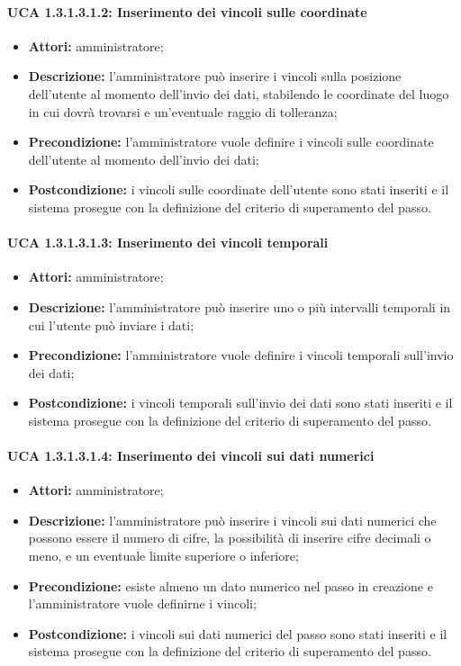 \paragraph{UCA 1.3.1.3.1.2: Inserimento dei vincoli sulle coordinate}
\begin{itemize}
\item \textbf{Attori:} 
amministratore;
\item \textbf{Descrizione:} 
l'amministratore può inserire i vincoli sulla posizione dell'utente al momento dell'invio dei dati, stabilendo le coordinate del luogo in cui dovrà trovarsi e un'eventuale raggio di tolleranza;
\item \textbf{Precondizione:} 
l'amministratore vuole definire i vincoli sulle coordinate dell'utente al momento dell'invio dei dati;
\item \textbf{Postcondizione:}
i vincoli sulle coordinate dell'utente sono stati inseriti e il sistema prosegue con la definizione del criterio di superamento del passo.
\end{itemize}

\paragraph{UCA 1.3.1.3.1.3: Inserimento dei vincoli temporali}
\begin{itemize}
\item \textbf{Attori:} 
amministratore;
\item \textbf{Descrizione:} 
l'amministratore può inserire uno o più intervalli temporali in cui l'utente può inviare i dati;
\item \textbf{Precondizione:} 
l'amministratore vuole definire i vincoli temporali sull'invio dei dati;
\item \textbf{Postcondizione:}
i vincoli temporali sull'invio dei dati sono stati inseriti e il sistema prosegue con la definizione del criterio di superamento del passo.
\end{itemize}

\paragraph{UCA 1.3.1.3.1.4: Inserimento dei vincoli sui dati numerici}
\begin{itemize}
\item \textbf{Attori:} 
amministratore;
\item \textbf{Descrizione:} 
l'amministratore può inserire i vincoli sui dati numerici che possono essere il numero di cifre, la possibilità di inserire cifre decimali o meno, e un eventuale limite superiore o inferiore;
\item \textbf{Precondizione:} 
esiste almeno un dato numerico nel passo in creazione e l'amministratore vuole definirne i vincoli;
\item \textbf{Postcondizione:}
i vincoli sui dati numerici del passo sono stati inseriti e il sistema prosegue con la definizione del criterio di superamento del passo.
\end{itemize}

